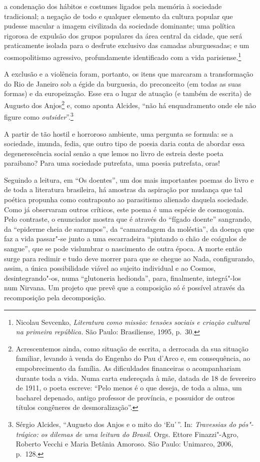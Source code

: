 \begin{hedraquote}
a condenação dos hábitos e costumes ligados pela memória à sociedade
tradicional; a negação de todo e qualquer elemento da cultura popular
que pudesse macular a imagem civilizada da sociedade dominante; uma
política rigorosa de expulsão dos grupos populares da área central da
cidade, que será praticamente isolada para o desfrute exclusivo das
camadas aburguesadas; e um cosmopolitismo agressivo, profundamente
identificado com a vida parisiense.\footnote{Nicolau Sevcenko, \textit{Literatura como missão: tensões
sociais e criação cultural na primeira república.} São Paulo: Brasiliense, 1995, p.~30.}
\end{hedraquote}

A exclusão e a violência foram, portanto, os itens que marcaram a
transformação do Rio de Janeiro sob a égide da burguesia, do
preconceito (em todas as suas formas) e da europeização. Esse era o lugar
de atuação (e também de escrita) de Augusto dos Anjos\footnote{
Acrescentemos ainda, como situação de escrita, a derrocada da sua
situação familiar, levando à venda do Engenho do Pau d’Arco e, em
consequência, ao empobrecimento da família. As dificuldades financeiras o
acompanhariam durante toda a vida. Numa carta endereçada à mãe, datada
de 18 de fevereiro de 1911, o poeta escreve: “Pelo menos é o que
deseja, de toda a alma, um bacharel depenado, antigo professor de
província, e possuidor de outros títulos congêneres de
desmoralização”.} e, como aponta Alcides, “não há enquadramento
onde ele não figure como \textit{outsider}”.\footnote{Sérgio Alcides, 
“Augusto dos Anjos e o mito do ‘Eu’\,”. In: \textit{Travessias do pós"-trágico: 
os dilemas de uma leitura do Brasil}. Orgs. Ettore Finazzi"-Agro, Roberto Vecchi e Maria Betânia
Amoroso. São Paulo: Unimarco, 2006, p.~128.}

A partir de tão hostil e horroroso ambiente, uma pergunta se
formula: se a sociedade, imunda, fedia, que outro tipo de poesia daria
conta de abordar essa degenerescência social senão a que lemos no livro
de estreia deste poeta paraibano? Para uma sociedade putrefata, uma
poesia putrefata, oras! 

Seguindo a leitura, em “Os doentes”, um dos mais importantes poemas
do livro e de toda a literatura brasileira, há amostras da aspiração
por mudança que tal poética propunha como contraponto ao parasitismo
alienado daquela sociedade. Como já observaram outros críticos, este
poema é uma espécie de cosmogonia. Pelo contraste, o enunciador mostra
que é através do “fígado doente” sangrando, da “epiderme cheia de
sarampos”, da “camaradagem da moléstia”, da doença que faz a vida
passar"-se junto a uma escarradeira “pintando o chão de coágulos de
sangue”, que se pode vislumbrar o nascimento de outra época. A morte
então surge para redimir e tudo deve morrer para que se chegue ao Nada,
configurando, assim, a única possibilidade viável ao sujeito individual
e ao Cosmos, desintegrando"-os, numa “glutoneria hedionda”, para,
finalmente, integrá"-los num Nirvana. Um projeto que prevê que a
composição só é possível através da recomposição pela decomposição.

